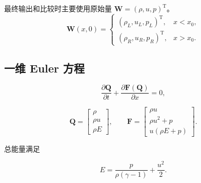 最终输出和比较时主要使用原始量 \(\bm W=(\rho,u,p)^{\mathrm T}\)。
\begin{equation}
\bm{W}(x,0)=
\begin{cases}
(\rho_L,u_L,p_L)^{\mathrm T}, & x<x_0,\\
(\rho_R,u_R,p_R)^{\mathrm T}, & x>x_0.
\end{cases}
\end{equation}

\subsection{一维 Euler 方程}

\begin{equation}
\frac{\partial \bm{Q}}{\partial t}
+
\frac{\partial \bm{F}(\bm{Q})}{\partial x}
=0,
\end{equation}

\begin{equation}
\bm{Q}=
\begin{bmatrix}
\rho\\
\rho u\\
\rho E
\end{bmatrix},
\qquad
\bm{F}=
\begin{bmatrix}
\rho u\\
\rho u^2+p\\
u(\rho E+p)
\end{bmatrix}.
\end{equation}

总能量满足

\begin{equation}
E=\frac{p}{\rho(\gamma-1)}+\frac{u^2}{2}.
\end{equation}
